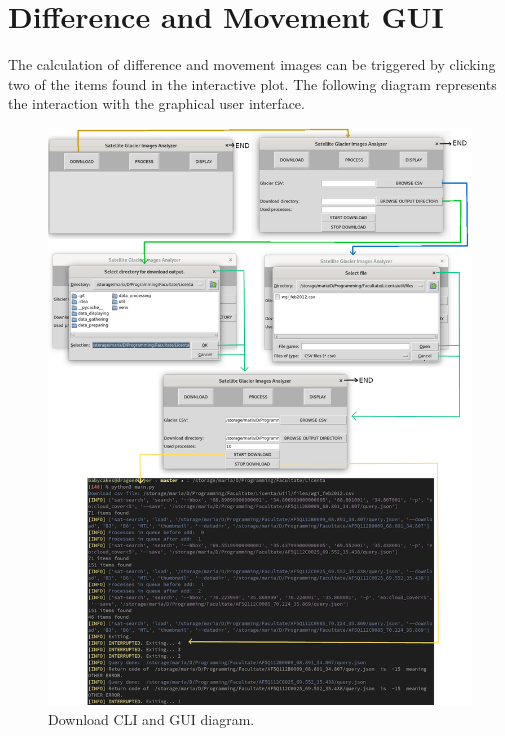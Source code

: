 \documentclass[12pt, a4paper]{report}
\begin{document}
	
	\section{Difference and Movement GUI}
	The calculation of difference and movement images can be triggered by clicking two of the items found in the interactive plot. The following diagram represents the interaction with the graphical user interface.
	
	\begin{figure}[H]
		\centering
		\includegraphics[scale=1.5]{download_gui_cmd.png}
		\caption{Download CLI and GUI diagram.}
		\label{fig:download_gui}
	\end{figure}
	
\end{document}
